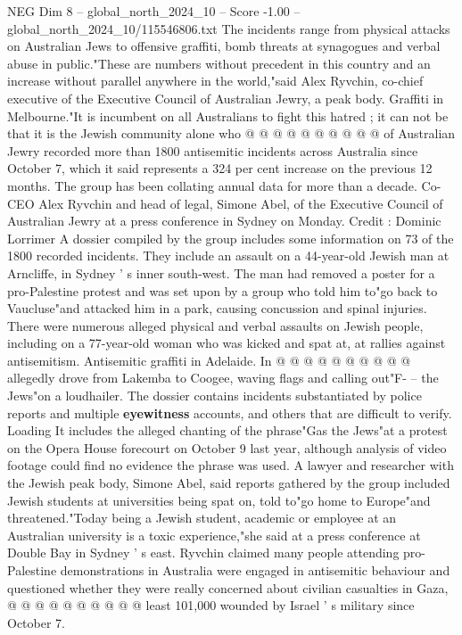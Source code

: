 \begin{textsample}{NEG Dim 8 – global\_north\_2024\_10 – Score -1.00 – global\_north\_2024\_10/115546806.txt}
The incidents range from physical attacks on Australian Jews to offensive graffiti, bomb threats at synagogues and verbal abuse in public."These are numbers without precedent in this country and an increase without parallel anywhere in the world,"said Alex Ryvchin, co-chief executive of the Executive Council of Australian Jewry, a peak body.
Graffiti in Melbourne."It is incumbent on all Australians to fight this hatred ; it can not be that it is the Jewish community alone who @ @ @ @ @ @ @ @ @ @ of Australian Jewry recorded more than 1800 antisemitic incidents across Australia since October 7, which it said represents a 324 per cent increase on the previous 12 months.
The group has been collating annual data for more than a decade.
Co-CEO Alex Ryvchin and head of legal, Simone Abel, of the Executive Council of Australian Jewry at a press conference in Sydney on Monday.
Credit : Dominic Lorrimer A dossier compiled by the group includes some information on 73 of the 1800 recorded incidents.
They include an assault on a 44-year-old Jewish man at Arncliffe, in Sydney ' s inner south-west.
The man had removed a poster for a pro-Palestine protest and was set upon by a group who told him to"go back to Vaucluse"and attacked him in a park, causing concussion and spinal injuries.
There were numerous alleged physical and verbal assaults on Jewish people, including on a 77-year-old woman who was kicked and spat at, at rallies against antisemitism.
Antisemitic graffiti in Adelaide.
In @ @ @ @ @ @ @ @ @ @ allegedly drove from Lakemba to Coogee, waving flags and calling out"F- -- the Jews"on a loudhailer.
The dossier contains incidents substantiated by police reports and multiple \textbf{eyewitness} accounts, and others that are difficult to verify.
Loading It includes the alleged chanting of the phrase"Gas the Jews"at a protest on the Opera House forecourt on October 9 last year, although analysis of video footage could find no evidence the phrase was used.
A lawyer and researcher with the Jewish peak body, Simone Abel, said reports gathered by the group included Jewish students at universities being spat on, told to"go home to Europe"and threatened."Today being a Jewish student, academic or employee at an Australian university is a toxic experience,"she said at a press conference at Double Bay in Sydney ' s east.
Ryvchin claimed many people attending pro-Palestine demonstrations in Australia were engaged in antisemitic behaviour and questioned whether they were really concerned about civilian casualties in Gaza, @ @ @ @ @ @ @ @ @ @ least 101,000 wounded by Israel ' s military since October 7.

\end{textsample}
